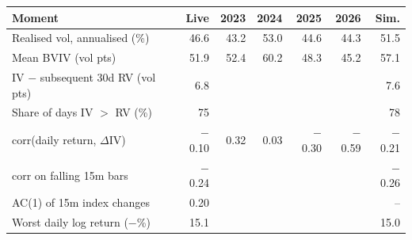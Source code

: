 \begin{tabular}{@{}lrrrrrr@{}}
\toprule
Moment & Live & 2023 & 2024 & 2025 & 2026 & Sim. \\
\midrule
Realised vol, annualised (\%) & 46.6 & 43.2 & 53.0 & 44.6 & 44.3 & 51.5 \\
Mean BVIV (vol pts) & 51.9 & 52.4 & 60.2 & 48.3 & 45.2 & 57.1 \\
IV $-$ subsequent 30d RV (vol pts) & 6.8 &  &  &  &  & 7.6 \\
Share of days IV $>$ RV (\%) & 75 &  &  &  &  & 78 \\
corr(daily return, $\Delta$IV) & \ensuremath{-}0.10 & 0.32 & 0.03 & \ensuremath{-}0.30 & \ensuremath{-}0.59 & \ensuremath{-}0.21 \\
corr on falling 15m bars & \ensuremath{-}0.24 &  &  &  &  & \ensuremath{-}0.26 \\
AC(1) of 15m index changes & 0.20 &  &  &  &  & -- \\
Worst daily log return ($-$\%) & 15.1 &  &  &  &  & 15.0 \\
\bottomrule
\end{tabular}
